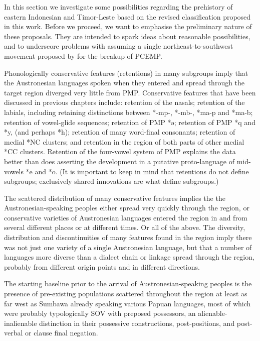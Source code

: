 In this section we investigate some possibilities regarding the
prehistory of eastern Indonesian
and Timor-Leste based on the revised classification proposed in this work.
Before we proceed, we want to emphasise the preliminary nature of these proposals.
They are intended to spark ideas about reasonable possibilities,
and to underscore problems with assuming a single northeast-to-southwest
movement proposed by \citet[98]{Blust2008} for the breakup of PCEMP.

Phonologically conservative features (retentions) in many subgroups
imply that the Austronesian languages spoken when they entered
and spread through the target region diverged very little from PMP.
Conservative features that have been discussed in previous chapters
include: retention of the nasals; retention of the labials,
including retaining distinctions between *-mp-,
*-mb-, *ma-p and *ma-b; retention of vowel-glide sequences; retention
of PMP *ə; retention of PMP *q
and *y, (and perhaps *h); retention of many word-final consonants;
retention of medial *NC clusters;
and retention in the region of both parts of other medial *CC clusters.
Retention of the four-vowel system of PMP explains the data better
than does asserting the development in a putative proto-language
of mid-vowels *e and *o.
(It is important to keep in mind that retentions do not define
subgroups; exclusively shared innovations are what define subgroups.)

The scattered distribution of many conservative features implies
the the Austronesian-speaking peoples either spread very quickly
through the region, or conservative varieties of Austronesian languages entered the
region in and from several different places or at different times.
Or all of the above.
The diversity, distribution and discontinuities of many features
found in the region imply there was not just one variety of a
single Austronesian language, but that a number of languages more diverse than a dialect chain
or linkage spread through the region,
probably from different origin points
and in different directions.

The starting baseline prior to the arrival of Austronesian-speaking
peoples is the presence of pre-existing populations scattered
throughout the region at least as far west as Sumbawa already
speaking various Papuan languages,
most of which were probably typologically SOV with preposed possessors,
an alienable-inalienable distinction in their possessive constructions,
post-positions, and post-verbal or clause final negation.

